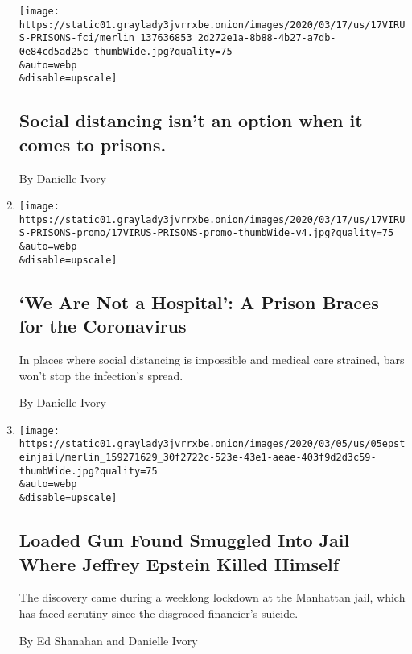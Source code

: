 \begin{enumerate}
  \texttt{[image: https://static01.graylady3jvrrxbe.onion/images/2020/03/17/us/17VIRUS-PRISONS-fci/merlin\_137636853\_2d272e1a-8b88-4b27-a7db-0e84cd5ad25c-thumbWide.jpg?quality=75\\\&auto=webp\\\&disable=upscale]}

  \hypertarget{social-distancing-isnt-an-option-when-it-comes-to-prisons}{%
  \subsection{Social distancing isn't an option when it comes to
  prisons.}\label{social-distancing-isnt-an-option-when-it-comes-to-prisons}}

  By Danielle Ivory
\item
  \href{/2020/03/17/us/coronavirus-prisons-jails.html}{}

  \texttt{[image: https://static01.graylady3jvrrxbe.onion/images/2020/03/17/us/17VIRUS-PRISONS-promo/17VIRUS-PRISONS-promo-thumbWide-v4.jpg?quality=75\\\&auto=webp\\\&disable=upscale]}

  \hypertarget{we-are-not-a-hospital-a-prison-braces-for-the-coronavirus}{%
  \subsection{`We Are Not a Hospital': A Prison Braces for the
  Coronavirus}\label{we-are-not-a-hospital-a-prison-braces-for-the-coronavirus}}

  In places where social distancing is impossible and medical care
  strained, bars won't stop the infection's spread.

  By Danielle Ivory
\item
  \href{/2020/03/06/nyregion/jeffrey-epstein-gun-jail.html}{}

  \texttt{[image: https://static01.graylady3jvrrxbe.onion/images/2020/03/05/us/05epsteinjail/merlin\_159271629\_30f2722c-523e-43e1-aeae-403f9d2d3c59-thumbWide.jpg?quality=75\\\&auto=webp\\\&disable=upscale]}

  \hypertarget{loaded-gun-found-smuggled-into-jail-where-jeffrey-epstein-killed-himself}{%
  \subsection{Loaded Gun Found Smuggled Into Jail Where Jeffrey Epstein
  Killed
  Himself}\label{loaded-gun-found-smuggled-into-jail-where-jeffrey-epstein-killed-himself}}

  The discovery came during a weeklong lockdown at the Manhattan jail,
  which has faced scrutiny since the disgraced financier's suicide.

  By Ed Shanahan and Danielle Ivory
\end{enumerate}

